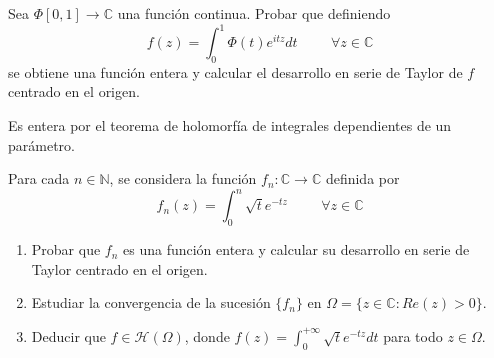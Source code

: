 \begin{ejer}
	Sea $\Phi [0,1]\rightarrow\mathbb{C}$ una función continua. Probar que definiendo
	$$ f(z) = \int_{0}^{1} \Phi(t)e^{itz}dt \hspace{1cm} \forall z\in\mathbb{C} $$
	se obtiene una función entera y calcular el desarrollo en serie de Taylor de $f$ centrado en el origen.
\end{ejer}
\begin{sol}
	Es entera por el teorema de holomorfía de integrales dependientes de un parámetro.
\end{sol}



\begin{ejer}
	Para cada $n\in\mathbb{N}$, se considera la función $f_n:\mathbb{C}\rightarrow\mathbb{C}$ definida por
	$$ f_n(z) = \int_{0}^{n} \sqrt{t}e^{-tz} \hspace{1cm} \forall z\in\mathbb{C} $$
	\begin{enumerate}[label=\alph*)]
		\item Probar que $f_n$ es una función entera y calcular su desarrollo en serie de Taylor centrado en el origen.
		\item Estudiar la convergencia de la sucesión $\{f_n\}$ en $\Omega = \{ z\in\mathbb{C} : Re(z)>0 \}$.
		\item Deducir que $f\in\mathcal{H}(\Omega)$, donde $f(z) = \int_{0}^{+\infty} \sqrt{t}e^{-tz}dt$ para todo $z\in\Omega$.
	\end{enumerate}
\end{ejer}

